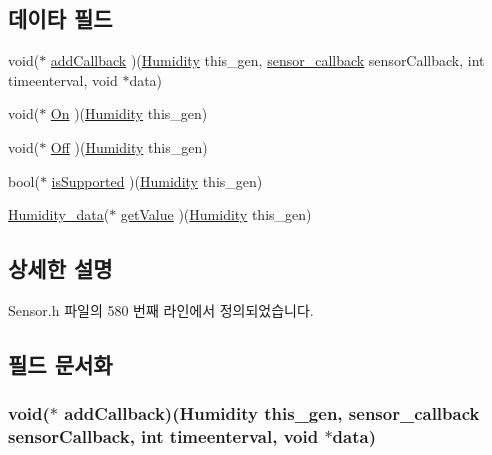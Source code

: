 \subsection*{데이타 필드}
\begin{DoxyCompactItemize}
\item 
void($\ast$ \hyperlink{struct___humidity_a3f415b07cdbb2f78be0c4ca124dd8317}{add\-Callback} )(\hyperlink{_sensor_8h_a5abed9efddb633f3bc97781dbd9870b2}{Humidity} this\-\_\-gen, \hyperlink{_sensor_8h_ad8114207845fc5e0aa30832f0c718cd6}{sensor\-\_\-callback} sensor\-Callback, int timeenterval, void $\ast$data)
\item 
void($\ast$ \hyperlink{struct___humidity_a2af8c8e73fea50ffa971fb6c71d2072d}{On} )(\hyperlink{_sensor_8h_a5abed9efddb633f3bc97781dbd9870b2}{Humidity} this\-\_\-gen)
\item 
void($\ast$ \hyperlink{struct___humidity_aca592716abbab5d419af4917c93717c8}{Off} )(\hyperlink{_sensor_8h_a5abed9efddb633f3bc97781dbd9870b2}{Humidity} this\-\_\-gen)
\item 
bool($\ast$ \hyperlink{struct___humidity_adda26eb4f1a4ee9bda6cacbbe67ec5b4}{is\-Supported} )(\hyperlink{_sensor_8h_a5abed9efddb633f3bc97781dbd9870b2}{Humidity} this\-\_\-gen)
\item 
\hyperlink{_sensor_8h_ab28ba6903f252ea8a21375f598f0b83f}{Humidity\-\_\-data}($\ast$ \hyperlink{struct___humidity_ab66479293e120169b7f5be17bb6b307a}{get\-Value} )(\hyperlink{_sensor_8h_a5abed9efddb633f3bc97781dbd9870b2}{Humidity} this\-\_\-gen)
\end{DoxyCompactItemize}


\subsection{상세한 설명}


Sensor.\-h 파일의 580 번째 라인에서 정의되었습니다.



\subsection{필드 문서화}
\hypertarget{struct___humidity_a3f415b07cdbb2f78be0c4ca124dd8317}{
\subsubsection[{add\-Callback}]{\setlength{\rightskip}{0pt plus 5cm}void($\ast$  add\-Callback)({\bf Humidity} this\-\_\-gen, {\bf sensor\-\_\-callback} sensor\-Callback, int timeenterval, void $\ast$data)}}\label{struct___humidity_a3f415b07cdbb2f78be0c4ca124dd8317}


